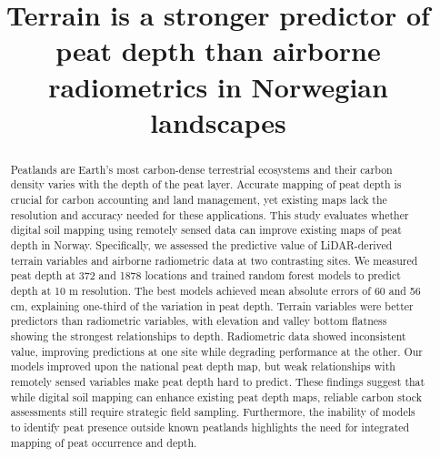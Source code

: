 \documentclass[soil, manuscript]{copernicus}
\begin{document}
\title{Terrain is a stronger predictor of peat depth than airborne radiometrics in Norwegian landscapes}











\received{}
\pubdiscuss{} %
\revised{}
\accepted{}
\published{}




\maketitle


\begin{abstract}
Peatlands are Earth's most carbon-dense terrestrial ecosystems and their carbon density varies with the depth of the peat layer.
Accurate mapping of peat depth is crucial for carbon accounting and land management, yet existing maps lack the resolution and accuracy needed for these applications.
This study evaluates whether digital soil mapping using remotely sensed data can improve existing maps of peat depth in Norway.
Specifically, we assessed the predictive value of LiDAR-derived terrain variables and airborne radiometric data at two contrasting sites.
We measured peat depth at 372 and 1878 locations and trained random forest models to predict depth at 10 m resolution.
The best models achieved mean absolute errors of 60 and 56 cm, explaining one-third of the variation in peat depth.
Terrain variables were better predictors than radiometric variables, with elevation and valley bottom flatness showing the strongest relationships to depth.
Radiometric data showed inconsistent value, improving predictions at one site while degrading performance at the other.
Our models improved upon the national peat depth map, but weak relationships with remotely sensed variables make peat depth hard to predict.
These findings suggest that while digital soil mapping can enhance existing peat depth maps, reliable carbon stock assessments still require strategic field sampling.
Furthermore, the inability of models to identify peat presence outside known peatlands highlights the need for integrated mapping of peat occurrence and depth.
\end{abstract}
\end{document}
